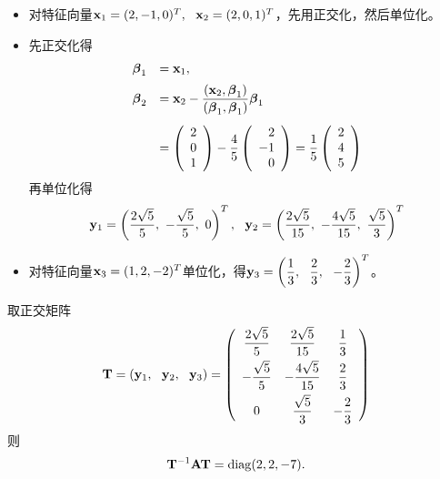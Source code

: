 \begin{frame}
  \begin{footnotesize}
\begin{itemize}
\item 对特征向量$\mathbf{x}_1=(2,-1,0)^T,~~\mathbf{x}_2=(2,0,1)^T$，先用正交化，然后单位化。
\item[] 先正交化得
      $$
      \begin{array}{rl}
        \boldsymbol{\beta}_1&=\mathbf{x}_1,\\[0.2cm]
        \boldsymbol{\beta}_2&\displaystyle =\mathbf{x}_2-\frac{(\mathbf{x}_2,\boldsymbol{\beta}_1)}{(\boldsymbol{\beta}_1,\boldsymbol{\beta}_1)}\boldsymbol{\beta}_1\\[0.2in]
        &\displaystyle=\left(
        \begin{array}{rrr}
          2\\0\\1
        \end{array}
        \right)-\frac45\left(
        \begin{array}{rrr}
          2\\-1\\0
        \end{array}
        \right)=\frac15\left(
        \begin{array}{rrr}
          2\\4\\5
        \end{array}
        \right)
      \end{array}
      $$
      \pause
      再单位化得
      $$
      \mathbf{y}_1=\left(\frac{2\sqrt{5}}{5},~-\frac{\sqrt{5}}{5},~0\right)^T,~~
      \mathbf{y}_2=\left(\frac{2\sqrt{5}}{15},~-\frac{4\sqrt{5}}{15},~\frac{\sqrt{5}}3\right)^T
      $$


\item
 对特征向量$\mathbf{x}_3=(1,2,-2)^T$单位化，得$\displaystyle \mathbf{y}_3=\left(\frac13,~~\frac23,~~-\frac23\right)^T$。
\end{itemize}
 \end{footnotesize}
\end{frame}


\begin{frame}
  \begin{footnotesize}
取正交矩阵
      $$
      \mathbf{T}=(\mathbf{y}_1,~~\mathbf{y}_2,~~\mathbf{y}_3)=\left(
      \begin{array}{ccc}
        \displaystyle\frac{2\sqrt{5}}{5}&\displaystyle\frac{2\sqrt{5}}{15}&\displaystyle\frac13\\[0.1in]
        \displaystyle-\frac{\sqrt{5}}{5}&\displaystyle-\frac{4\sqrt{5}}{15}&\displaystyle\frac23\\[0.1in]
        0&\displaystyle\frac{\sqrt{5}}3&\displaystyle-\frac23
      \end{array}
      \right)
      $$
      则
      $$
      \mathbf{T}^{-1}\mathbf{A}\mathbf{T}=\mathrm{diag}(2,2,-7).
      $$

  \end{footnotesize}
\end{frame}


